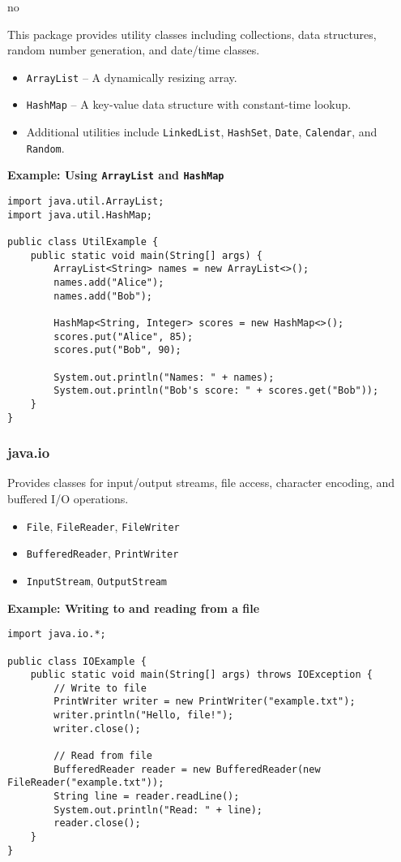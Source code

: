 no\documentclass{article}
\newcommand{\codecmd}[1]{\textcolor[rgb]{0,0.5,0}{\texttt{#1}}}
\begin{document}
This package provides utility classes including collections, data structures, random number generation, and date/time classes.

\begin{itemize}
    \item \codecmd{ArrayList} – A dynamically resizing array.
    \item \codecmd{HashMap} – A key-value data structure with constant-time lookup.
    \item Additional utilities include \codecmd{LinkedList}, \codecmd{HashSet}, \codecmd{Date}, \codecmd{Calendar}, and \codecmd{Random}.
\end{itemize}

\noindent\textbf{Example: Using \codecmd{ArrayList} and \codecmd{HashMap}}
\begin{verbatim}
import java.util.ArrayList;
import java.util.HashMap;

public class UtilExample {
    public static void main(String[] args) {
        ArrayList<String> names = new ArrayList<>();
        names.add("Alice");
        names.add("Bob");

        HashMap<String, Integer> scores = new HashMap<>();
        scores.put("Alice", 85);
        scores.put("Bob", 90);

        System.out.println("Names: " + names);
        System.out.println("Bob's score: " + scores.get("Bob"));
    }
}
\end{verbatim}

\subsubsection*{java.io}

Provides classes for input/output streams, file access, character encoding, and buffered I/O operations.

\begin{itemize}
    \item \codecmd{File}, \codecmd{FileReader}, \codecmd{FileWriter}
    \item \codecmd{BufferedReader}, \codecmd{PrintWriter}
    \item \codecmd{InputStream}, \codecmd{OutputStream}
\end{itemize}

\noindent\textbf{Example: Writing to and reading from a file}
\begin{verbatim}
import java.io.*;

public class IOExample {
    public static void main(String[] args) throws IOException {
        // Write to file
        PrintWriter writer = new PrintWriter("example.txt");
        writer.println("Hello, file!");
        writer.close();

        // Read from file
        BufferedReader reader = new BufferedReader(new FileReader("example.txt"));
        String line = reader.readLine();
        System.out.println("Read: " + line);
        reader.close();
    }
}
\end{verbatim}
\end{document}

